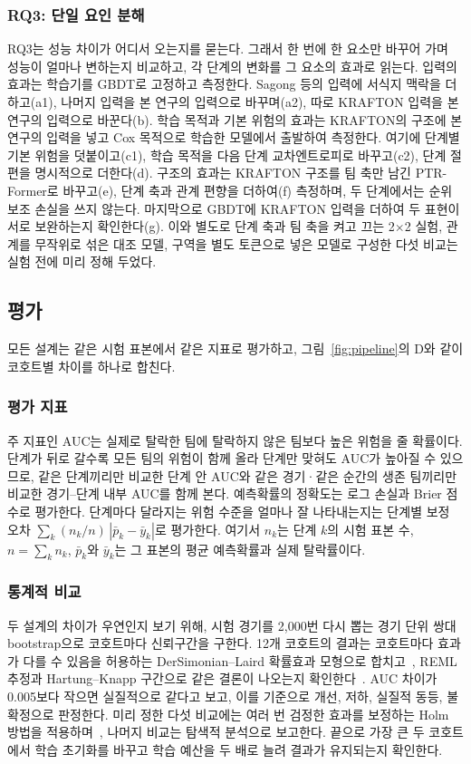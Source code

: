 \subsubsection{RQ3: 단일 요인 분해}
\label{sec:method:decomposition}
RQ3는 성능 차이가 어디서 오는지를 묻는다. 그래서 한 번에 한 요소만 바꾸어 가며 성능이 얼마나 변하는지 비교하고, 각 단계의 변화를 그 요소의 효과로 읽는다.
입력의 효과는 학습기를 GBDT로 고정하고 측정한다. Sagong 등의 입력에 서식지 맥락을 더하고(a1), 나머지 입력을 본 연구의 입력으로 바꾸며(a2), 따로 KRAFTON 입력을 본 연구의 입력으로 바꾼다(b).
학습 목적과 기본 위험의 효과는 KRAFTON의 구조에 본 연구의 입력을 넣고 Cox 목적으로 학습한 모델에서 출발하여 측정한다. 여기에 단계별 기본 위험을 덧붙이고(c1), 학습 목적을 다음 단계 교차엔트로피로 바꾸고(c2), 단계 절편을 명시적으로 더한다(d).
구조의 효과는 KRAFTON 구조를 팀 축만 남긴 PTR-Former로 바꾸고(e), 단계 축과 관계 편향을 더하여(f) 측정하며, 두 단계에서는 순위 보조 손실을 쓰지 않는다.
마지막으로 GBDT에 KRAFTON 입력을 더하여 두 표현이 서로 보완하는지 확인한다(g).
이와 별도로 단계 축과 팀 축을 켜고 끄는 2$\times$2 실험, 관계를 무작위로 섞은 대조 모델, 구역을 별도 토큰으로 넣은 모델로 구성한 다섯 비교는 실험 전에 미리 정해 두었다.

\subsection{평가}
\label{sec:method:evaluation}
모든 설계는 같은 시험 표본에서 같은 지표로 평가하고, 그림~\ref{fig:pipeline}의 D와 같이 코호트별 차이를 하나로 합친다.

\subsubsection{평가 지표}
주 지표인 AUC는 실제로 탈락한 팀에 탈락하지 않은 팀보다 높은 위험을 줄 확률이다.
단계가 뒤로 갈수록 모든 팀의 위험이 함께 올라 단계만 맞혀도 AUC가 높아질 수 있으므로, 같은 단계끼리만 비교한 단계 안 AUC와 같은 경기·같은 순간의 생존 팀끼리만 비교한 경기--단계 내부 AUC를 함께 본다.
예측확률의 정확도는 로그 손실과 Brier 점수로 평가한다.
단계마다 달라지는 위험 수준을 얼마나 잘 나타내는지는 단계별 보정 오차 $\sum_{k}(n_k/n)\,|\bar{p}_k-\bar{y}_k|$로 평가한다. 여기서 $n_k$는 단계 $k$의 시험 표본 수, $n=\sum_k n_k$, $\bar{p}_k$와 $\bar{y}_k$는 그 표본의 평균 예측확률과 실제 탈락률이다.

\subsubsection{통계적 비교}
두 설계의 차이가 우연인지 보기 위해, 시험 경기를 2,000번 다시 뽑는 경기 단위 쌍대 bootstrap으로 코호트마다 신뢰구간을 구한다.
12개 코호트의 결과는 코호트마다 효과가 다를 수 있음을 허용하는 DerSimonian--Laird 확률효과 모형으로 합치고~\cite{DerSimonian86}, REML 추정과 Hartung--Knapp 구간으로 같은 결론이 나오는지 확인한다~\cite{HartungKnapp01}.
AUC 차이가 0.005보다 작으면 실질적으로 같다고 보고, 이를 기준으로 개선, 저하, 실질적 동등, 불확정으로 판정한다.
미리 정한 다섯 비교에는 여러 번 검정한 효과를 보정하는 Holm 방법을 적용하며~\cite{Holm79}, 나머지 비교는 탐색적 분석으로 보고한다.
끝으로 가장 큰 두 코호트에서 학습 초기화를 바꾸고 학습 예산을 두 배로 늘려 결과가 유지되는지 확인한다.
